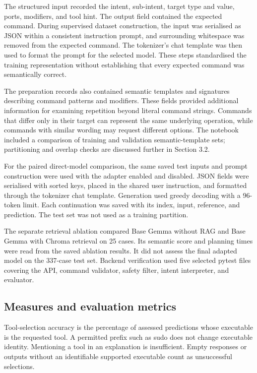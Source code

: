 \documentclass[
]{article}
\begin{document}
The structured input recorded the intent, sub-intent, target type and
value, ports, modifiers, and tool hint. The output field contained the
expected command. During supervised dataset construction, the input was
serialised as JSON within a consistent instruction prompt, and
surrounding whitespace was removed from the expected command. The
tokenizer's chat template was then used to format the prompt for the
selected model. These steps standardised the training representation
without establishing that every expected command was semantically
correct.

The preparation records also contained semantic templates and signatures
describing command patterns and modifiers. These fields provided
additional information for examining repetition beyond literal command
strings. Commands that differ only in their target can represent the
same underlying operation, while commands with similar wording may
request different options. The notebook included a comparison of
training and validation semantic-template sets; partitioning and overlap
checks are discussed further in Section 3.2.

For the paired direct-model comparison, the same saved test inputs and
prompt construction were used with the adapter enabled and disabled.
JSON fields were serialised with sorted keys, placed in the shared user
instruction, and formatted through the tokenizer chat template.
Generation used greedy decoding with a 96-token limit. Each continuation
was saved with its index, input, reference, and prediction. The test set
was not used as a training partition.

The separate retrieval ablation compared Base Gemma without RAG and Base
Gemma with Chroma retrieval on 25 cases. Its semantic score and planning
times were read from the saved ablation results. It did not assess the
final adapted model on the 337-case test set. Backend verification used
five selected pytest files covering the API, command validator, safety
filter, intent interpreter, and evaluator.

\hypertarget{measures-and-evaluation-metrics}{%
\subsection{Measures and evaluation
metrics}\label{measures-and-evaluation-metrics}}

Tool-selection accuracy is the percentage of assessed predictions whose
executable is the requested tool. A permitted prefix such as sudo does
not change executable identity. Mentioning a tool in an explanation is
insufficient. Empty responses or outputs without an identifiable
supported executable count as unsuccessful selections.
\end{document}
